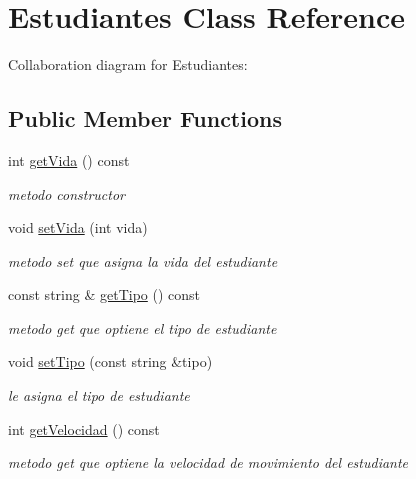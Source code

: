 \hypertarget{classEstudiantes}{}\section{Estudiantes Class Reference}
\label{classEstudiantes}


Collaboration diagram for Estudiantes\+:
\subsection*{Public Member Functions}
\begin{DoxyCompactItemize}
\item 
int \hyperlink{classEstudiantes_aeda64563ecb0ff1d54f848fcd75475b4}{get\+Vida} () const
\begin{DoxyCompactList}\small\item\em metodo constructor \end{DoxyCompactList}\item 
\mbox{\label{classEstudiantes_aab7c82991792bcadcbafc0027ba115d9}} 
void \hyperlink{classEstudiantes_aab7c82991792bcadcbafc0027ba115d9}{set\+Vida} (int vida)
\begin{DoxyCompactList}\small\item\em metodo set que asigna la vida del estudiante \end{DoxyCompactList}\item 
const string \& \hyperlink{classEstudiantes_a53ae5b8458793626eb820538a5862edd}{get\+Tipo} () const
\begin{DoxyCompactList}\small\item\em metodo get que optiene el tipo de estudiante \end{DoxyCompactList}\item 
void \hyperlink{classEstudiantes_ab2a2cbcdd7be2b8af8aadaca3c641aca}{set\+Tipo} (const string \&tipo)
\begin{DoxyCompactList}\small\item\em le asigna el tipo de estudiante \end{DoxyCompactList}\item 
\mbox{\label{classEstudiantes_aacf0d31a67bba19425faebe15ffd22d3}} 
int \hyperlink{classEstudiantes_aacf0d31a67bba19425faebe15ffd22d3}{get\+Velocidad} () const
\begin{DoxyCompactList}\small\item\em metodo get que optiene la velocidad de movimiento del estudiante \end{DoxyCompactList}\item 

\end{DoxyCompactItemize}
